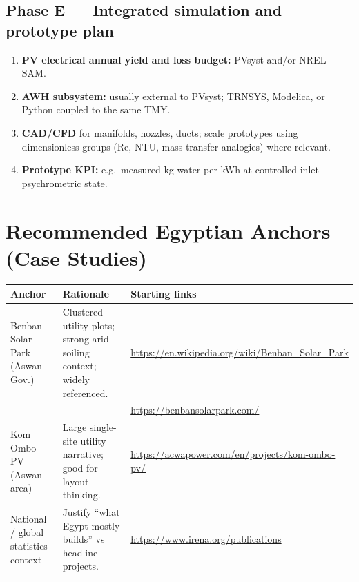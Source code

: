 \documentclass[11pt,a4paper]{article}
\begin{document}
\subsection{Phase E --- Integrated simulation and prototype plan}
\begin{enumerate}[resume,leftmargin=*]
  \item \textbf{PV electrical annual yield and loss budget:} PVsyst and/or NREL SAM.
  \item \textbf{AWH subsystem:} usually external to PVsyst; TRNSYS, Modelica, or Python coupled to the same TMY.
  \item \textbf{CAD/CFD} for manifolds, nozzles, ducts; scale prototypes using dimensionless groups (Re, NTU, mass-transfer analogies) where relevant.
  \item \textbf{Prototype KPI:} e.g.\ measured kg water per kWh at controlled inlet psychrometric state.
\end{enumerate}

\section{Recommended Egyptian Anchors (Case Studies)}
\begin{table}[h]
\centering
\begin{tabular}{@{}p{3.2cm}p{5.8cm}p{6.2cm}@{}}
\toprule
\textbf{Anchor} & \textbf{Rationale} & \textbf{Starting links} \\
\midrule
Benban Solar Park (Aswan Gov.) &
Clustered utility plots; strong arid soiling context; widely referenced. &
\url{https://en.wikipedia.org/wiki/Benban_Solar_Park}\\
&& \url{https://benbansolarpark.com/}\\
\midrule
Kom Ombo PV (Aswan area) &
Large single-site utility narrative; good for layout thinking. &
\url{https://acwapower.com/en/projects/kom-ombo-pv/}\\
\midrule
National / global statistics context &
Justify ``what Egypt mostly builds'' vs headline projects. &
\url{https://www.irena.org/publications}\\
\bottomrule
\end{tabular}
\end{table}
\end{document}
